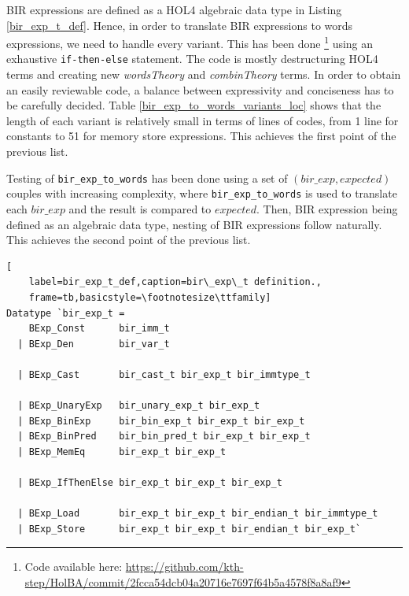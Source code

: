 \documentclass{kththesis}
\begin{document}
BIR expressions are defined as a HOL4 algebraic data type in Listing \ref{bir_exp_t_def}. Hence, in order to translate BIR expressions to words expressions, we need to handle every variant. This has been done \footnote{Code available here: \url{https://github.com/kth-step/HolBA/commit/2fcca54dcb04a20716e7697f64b5a4578f8a8af9}} using an exhaustive \texttt{if-then-else} statement\footnotemark. The code is mostly destructuring HOL4 terms and creating new \textit{wordsTheory} and \textit{combinTheory} terms. In order to obtain an easily reviewable code, a balance between expressivity and conciseness has to be carefully decided. Table \ref{bir_exp_to_words_variants_loc} shows that the length of each variant is relatively small in terms of lines of codes, from 1 line for constants to 51 for memory store expressions. This achieves the first point of the previous list.


Testing of \texttt{bir\_exp\_to\_words} has been done using a set of $(bir\_exp,expected)$ couples with increasing complexity, where \texttt{bir\_exp\_to\_words} is used to translate each $bir\_exp$ and the result is compared to $expected$. Then, BIR expression being defined as an algebraic data type, nesting of BIR expressions follow naturally. This achieves the second point of the previous list.

\begin{lstlisting}[
    label=bir_exp_t_def,caption=bir\_exp\_t definition.,
    frame=tb,basicstyle=\footnotesize\ttfamily]
Datatype `bir_exp_t =
    BExp_Const      bir_imm_t
  | BExp_Den        bir_var_t

  | BExp_Cast       bir_cast_t bir_exp_t bir_immtype_t

  | BExp_UnaryExp   bir_unary_exp_t bir_exp_t
  | BExp_BinExp     bir_bin_exp_t bir_exp_t bir_exp_t
  | BExp_BinPred    bir_bin_pred_t bir_exp_t bir_exp_t
  | BExp_MemEq      bir_exp_t bir_exp_t

  | BExp_IfThenElse bir_exp_t bir_exp_t bir_exp_t

  | BExp_Load       bir_exp_t bir_exp_t bir_endian_t bir_immtype_t
  | BExp_Store      bir_exp_t bir_exp_t bir_endian_t bir_exp_t`
\end{lstlisting}
\end{document}
